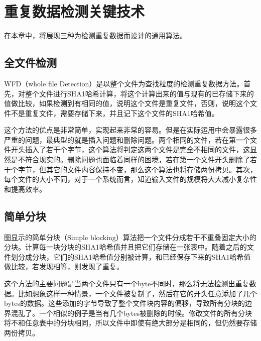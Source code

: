 
\chapter{重复数据检测关键技术}
\label{chap:tech}

在本章中，将展现三种为检测重复数据而设计的通用算法。
\section{全文件检测}
\label{sec:WFD}

WFD（whole file Detection）是以整个文件为查找粒度的检测重复数据方法。首先，对整个文件进行SHA1哈希计算，将这个计算出来的值与现有的已存储下来的值做比较，如果检测到有相同的值，说明这个文件是重复文件，否则，说明这个文件不是重复文件，需要存储下来，并且记下这个文件的SHA1哈希值。

这个方法的优点是非常简单，实现起来非常的容易。但是在实际运用中会暴露很多严重的问题，最典型的就是插入问题和删除问题。两个相同的文件，若在第一个文件开头插入了若干个字节，这个算法将判定这两个文件是完全不相同的文件，这显然是不符合现实的。删除问题也面临着同样的困境，若在第一个文件开头删除了若干个字节，但其它的文件内容保持不变，那么这个算法也将存储两份拷贝。其次，每个文件的大小不同，对于一个系统而言，知道输入文件的规模将大大减小复杂性和提高效率。

\section{简单分块}
\label{sec:simpleblock}

图显示的简单分块（Simple blocking）算法把一个文件分成若干不重叠固定大小的分块。计算每一块分块的SHA1哈希值并且把它们存储在一张表中。随着之后的文件划分成分块，它们的SHA1哈希值分别被计算，和已经保存下来的SHA1哈希值做比较，若发现相等，则发现了重复。

这个方法的主要问题是当两个文件只有一个byte不同时，那么将无法检测出重复数据。比如想象这样一种情景，一个文件被复制了，然后在它的开头任意添加了几个bytes的数据。这些添加的字节导致了整个文件块内容的偏移，导致所有分块的边界混乱了。一个相似的例子是当有几个bytes被删除的时候。修改文件的所有分块将不和任意表中的分块相同，所以文件中即使有绝大部分是相同的，但仍然要存储两份拷贝。

